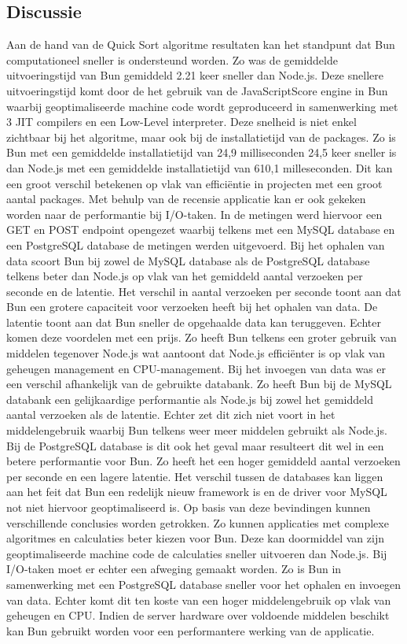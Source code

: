 \subsection{Discussie}
Aan de hand van de Quick Sort algoritme resultaten kan het standpunt dat Bun computationeel sneller is ondersteund worden.
Zo was de gemiddelde uitvoeringstijd van Bun gemiddeld 2.21 keer sneller dan Node.js. Deze snellere uitvoeringstijd komt door de
het gebruik van de JavaScriptScore engine in Bun waarbij geoptimaliseerde machine code wordt geproduceerd in 
samenwerking met 3 JIT compilers en een Low-Level interpreter.
Deze snelheid is niet enkel zichtbaar bij het algoritme, maar ook bij de installatietijd van de packages.
Zo is Bun met een gemiddelde installatietijd van 24,9 milliseconden 24,5 keer sneller is dan Node.js met een 
gemiddelde installatietijd van 610,1 milleseconden. Dit kan een groot verschil betekenen op vlak van efficiëntie in projecten 
met een groot aantal packages.
Met behulp van de recensie applicatie kan er ook gekeken worden naar de performantie bij I/O-taken.
In de metingen werd hiervoor een GET en POST endpoint opengezet waarbij telkens met een MySQL database en een PostgreSQL database de metingen werden uitgevoerd.
Bij het ophalen van data scoort Bun bij zowel de MySQL database als de PostgreSQL database telkens beter dan Node.js op vlak van het gemiddeld aantal verzoeken per seconde en de latentie.
Het verschil in aantal verzoeken per seconde toont aan dat Bun een grotere capaciteit voor verzoeken heeft bij het ophalen van data.
De latentie toont aan dat Bun sneller de opgehaalde data kan teruggeven. Echter komen deze voordelen met een prijs. 
Zo heeft Bun telkens een groter gebruik van middelen tegenover Node.js wat aantoont dat Node.js efficiënter is op vlak van geheugen management en CPU-management.
Bij het invoegen van data was er een verschil afhankelijk van de gebruikte databank. Zo heeft Bun bij de MySQL databank een gelijkaardige performantie
als Node.js bij zowel het gemiddeld aantal verzoeken als de latentie. 
Echter zet dit zich niet voort in het middelengebruik waarbij Bun telkens weer meer middelen gebruikt als Node.js.
Bij de PostgreSQL database is dit ook het geval maar resulteert dit wel in een betere performantie voor Bun. 
Zo heeft het een hoger gemiddeld aantal verzoeken per seconde en een lagere latentie.
Het verschil tussen de databases kan liggen aan het feit dat Bun een redelijk nieuw framework is 
en de driver voor MySQL not niet hiervoor geoptimaliseerd is.
Op basis van deze bevindingen kunnen verschillende conclusies worden getrokken. 
Zo kunnen applicaties met complexe algoritmes en calculaties beter kiezen voor Bun. 
Deze kan doormiddel van zijn geoptimaliseerde machine code de calculaties sneller uitvoeren dan Node.js.
Bij I/O-taken moet er echter een afweging gemaakt worden. Zo is Bun in samenwerking met een PostgreSQL database sneller voor het ophalen en invoegen van data.
Echter komt dit ten koste van een hoger middelengebruik op vlak van geheugen en CPU. 
Indien de server hardware over voldoende middelen beschikt kan Bun gebruikt worden voor een performantere werking van de applicatie.

